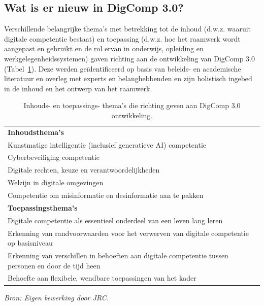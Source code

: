 \documentclass[
  dutch,
  letterpaper,
  DIV=11,
  numbers=noendperiod]{scrartcl}
\begin{document}
\subsection{Wat is er nieuw in DigComp
3.0?}\label{sec-wat-is-er-nieuw-in-digcomp-3.0}

Verschillende belangrijke thema's met betrekking tot de inhoud (d.w.z.
waaruit digitale competentie bestaat) en toepassing (d.w.z. hoe het
raamwerk wordt aangepast en gebruikt en de rol ervan in onderwijs,
opleiding en werkgelegenheidssystemen) gaven richting aan de
ontwikkeling van DigComp 3.0 (Tabel~\ref{tbl-themas}). Deze werden
geïdentificeerd op basis van beleids- en academische literatuur en
overleg met experts en belanghebbenden en zijn holistisch ingebed in de
inhoud en het ontwerp van het raamwerk.

\begin{longtable}[]{@{}
  >{\raggedright\arraybackslash}p{}@{}}
\caption{Inhouds- en toepassings- thema's die richting geven aan DigComp
3.0 ontwikkeling.}\label{tbl-themas}\tabularnewline
\toprule\noalign{}
\endfirsthead
\endhead
\bottomrule\noalign{}
\endlastfoot
\textbf{Inhoudsthema's} \\
Kunstmatige intelligentie (inclusief generatieve AI) competentie \\
Cyberbeveiliging competentie \\
Digitale rechten, keuze en verantwoordelijkheden \\
Welzijn in digitale omgevingen \\
Competentie om misinformatie en desinformatie aan te pakken \\
\textbf{Toepassingsthema's} \\
Digitale competentie als essentieel onderdeel van een leven lang
leren \\
Erkenning van randvoorwaarden voor het verwerven van digitale
competentie op basisniveau \\
Erkenning van verschillen in behoeften aan digitale competentie tussen
personen en door de tijd heen \\
Behoefte aan flexibele, wendbare toepassingen van het kader \\
\end{longtable}

\emph{Bron: Eigen bewerking door JRC.}
\end{document}
